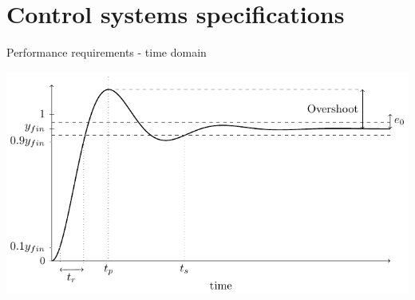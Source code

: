 \documentclass[presentation,aspectratio=169, usenames, dvipsnames]{beamer}
\begin{document}
\section{Control systems specifications}
\label{sec:org381a6df}

\begin{frame}[label={sec:org3355b21}]{Performance requirements - time domain}
\begin{center}
  \includegraphics[width=.8\linewidth]{../../figures/step-response-specifications}
\end{center}
\end{frame}
\end{document}
